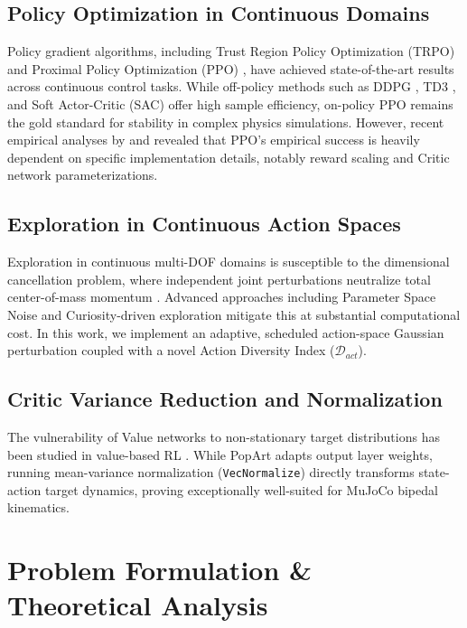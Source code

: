 \documentclass{article}
\begin{document}
\subsection{Policy Optimization in Continuous Domains}
Policy gradient algorithms, including Trust Region Policy Optimization (TRPO) \citep{schulman2015trust} and Proximal Policy Optimization (PPO) \citep{schulman2017proximal}, have achieved state-of-the-art results across continuous control tasks. While off-policy methods such as DDPG \citep{lillicrap2015continuous}, TD3 \citep{fujimoto2018addressing}, and Soft Actor-Critic (SAC) \citep{haarnoja2018soft} offer high sample efficiency, on-policy PPO remains the gold standard for stability in complex physics simulations. However, recent empirical analyses by \citet{engstrom2020implementation} and \citet{andrychowicz2021matters} revealed that PPO's empirical success is heavily dependent on specific implementation details, notably reward scaling and Critic network parameterizations.

\subsection{Exploration in Continuous Action Spaces}
Exploration in continuous multi-DOF domains is susceptible to the dimensional cancellation problem, where independent joint perturbations neutralize total center-of-mass momentum \citep{plappert2018parameter}. Advanced approaches including Parameter Space Noise \citep{fortunato2018noisy, plappert2018parameter} and Curiosity-driven exploration \citep{pathak2017curiosity} mitigate this at substantial computational cost. In this work, we implement an adaptive, scheduled action-space Gaussian perturbation coupled with a novel Action Diversity Index ($\mathcal{D}_{act}$).

\subsection{Critic Variance Reduction and Normalization}
The vulnerability of Value networks to non-stationary target distributions has been studied in value-based RL \citep{van2016learning, hasselt2016deep}. While PopArt \citep{van2016learning} adapts output layer weights, running mean-variance normalization (\texttt{VecNormalize}) directly transforms state-action target dynamics, proving exceptionally well-suited for MuJoCo bipedal kinematics.

\section{Problem Formulation \& Theoretical Analysis}
\label{sec:theory}
\end{document}
